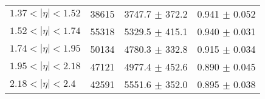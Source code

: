 \begin{tabular}{lccc}
$1.37 < |\eta| <1.52$          & 38615      & 3747.7     $\pm$ 372.2 & 0.941      $\pm$ 0.052 \\
$1.52 < |\eta| <1.74$          & 55318      & 5329.5     $\pm$ 415.1 & 0.940      $\pm$ 0.031 \\
$1.74 < |\eta| <1.95$          & 50134      & 4780.3     $\pm$ 332.8 & 0.915      $\pm$ 0.034 \\
$1.95 < |\eta| <2.18$          & 47121      & 4977.4     $\pm$ 452.6 & 0.890      $\pm$ 0.045 \\
$2.18 < |\eta| <2.4$           & 42591      & 5551.6     $\pm$ 352.0 & 0.895      $\pm$ 0.038 \\
\hline
\end{tabular}
